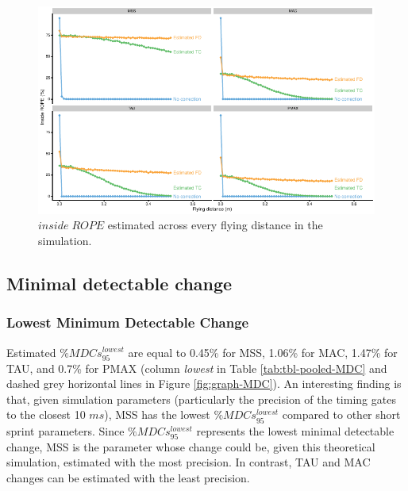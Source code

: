 \documentclass[fleqn,10pt]{wlpeerj} %
\begin{document}
\begin{figure}

{\centering \includegraphics[width=0.9\linewidth]{shorts-simulation-paper_files/figure-latex/graph-inside-ROPE-1} 

}

\caption{\(inside \; ROPE\) estimated across every flying distance in the simulation.}\label{fig:graph-inside-ROPE}
\end{figure}

\hypertarget{minimal-detectable-change}{%
\subsection{Minimal detectable change}\label{minimal-detectable-change}}

\hypertarget{lowest-minimum-detectable-change}{%
\subsubsection{Lowest Minimum Detectable Change}\label{lowest-minimum-detectable-change}}

Estimated \(\%MDCs_{95}^{lowest}\) are equal to 0.45\% for MSS, 1.06\% for MAC, 1.47\% for TAU, and 0.7\% for PMAX (column \emph{lowest} in Table \ref{tab:tbl-pooled-MDC} and dashed grey horizontal lines in Figure \ref{fig:graph-MDC}). An interesting finding is that, given simulation parameters (particularly the precision of the timing gates to the closest 10 \(ms\)), MSS has the lowest \(\%MDCs_{95}^{lowest}\) compared to other short sprint parameters. Since \(\%MDCs_{95}^{lowest}\) represents the lowest minimal detectable change, MSS is the parameter whose change could be, given this theoretical simulation, estimated with the most precision. In contrast, TAU and MAC changes can be estimated with the least precision.
\end{document}
